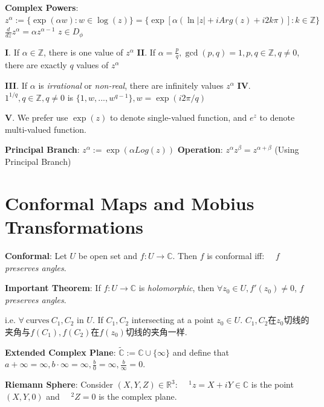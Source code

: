 \documentclass[9pt]{article}
\begin{document}
\textbf{Complex Powers}: $z^{\alpha}:=\{\exp(\alpha w):w\in\log(z)\}=\{\exp[\alpha(\ln|z|+iArg(z)+i2k\pi)]:k\in\mathbb{Z}\}$ \quad \qquad \qquad \qquad $\frac{d}{dz}z^\alpha=\alpha z^{\alpha-1}$ {\tiny $z\in D_{\phi}$}

\qquad\textbf{I}. If $\alpha\in\mathbb{Z}$, there is one value of $z^{\alpha}$ \quad \quad \textbf{II}. If $\alpha=\frac{p}{q},\gcd(p,q)=1,p,q\in\mathbb{Z},q\ne0$, there are exactly $q$ values of $z^{\alpha}$

\qquad\textbf{III}. If $\alpha$ is \textit{irrational} or \textit{non-real}, there are infinitely values $z^{\alpha}$ \quad \quad \textbf{IV}. $1^{1/q},q\in\mathbb{Z},q\ne0$ is $\{1,w,...,w^{q-1}\},w=\exp(i2\pi/q)$

\qquad\textbf{V}. We prefer use $\exp(z)$ to denote single-valued function, and $e^z$ to denote multi-valued function. 

\qquad\textbf{Principal Branch}: $z^{\alpha}:=\exp(\alpha Log(z))$ \qquad \qquad \textbf{Operation}: $z^{\alpha}z^{\beta}=z^{\alpha+\beta}$ {\footnotesize (Using Principal Branch)} 


\section{Conformal Maps and Mobius Transformations} %

\textbf{Conformal}: Let $U$ be open set and $f:U\to\mathbb{C}$. Then $f$ is conformal iff: \ \ $f$ \textit{preserves angles}. 

\quad \textbf{Important Theorem}: If $f:U\to\mathbb{C}$ is \textit{holomorphic}, then $\forall z_0\in U,f'(z_0)\ne0$, $f$ \textit{preserves angles}.

\quad i.e. $\forall \ \text{curves} \ C_1,C_2$ in $U$. If $C_1,C_2$ intersecting at a point $z_0\in U$. {\scriptsize $C_1,C_2$在$z_0$切线的夹角与$f(C_1),f(C_2)$在$f(z_0)$切线的夹角一样.}

\textbf{Extended Complex Plane}: $\widetilde{\mathbb{C}}:=\mathbb{C}\cup\{\infty\}$ and define that $a+\infty=\infty,b\cdot\infty=\infty,\frac{b}{0}=\infty,\frac{b}{\infty}=0$.

\textbf{Riemann Sphere}: Consider $(X,Y,Z)\in\mathbb{R}^3$: \ \ $^1z=X+iY\in\mathbb{C}$ is the point $(X,Y,0)$ and \ \ $^2 Z=0$ is the complex plane.
\end{document}
